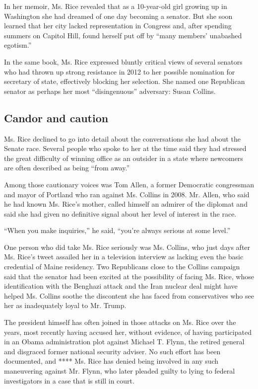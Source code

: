 In her memoir, Ms. Rice revealed that as a 10-year-old girl growing up
in Washington she had dreamed of one day becoming a senator. But she
soon learned that her city lacked representation in Congress and, after
spending summers on Capitol Hill, found herself put off by ``many
members' unabashed egotism.''

In the same book, Ms. Rice expressed bluntly critical views of several
senators who had thrown up strong resistance in 2012 to her possible
nomination for secretary of state, effectively blocking her selection.
She named one Republican senator as perhaps her most ``disingenuous''
adversary: Susan Collins.

\hypertarget{candor-and-caution}{%
\subsection{Candor and caution}\label{candor-and-caution}}

Ms. Rice declined to go into detail about the conversations she had
about the Senate race. Several people who spoke to her at the time said
they had stressed the great difficulty of winning office as an outsider
in a state where newcomers are often described as being ``from away.''

Among those cautionary voices was Tom Allen, a former Democratic
congressman and mayor of Portland who ran against Ms. Collins in 2008.
Mr. Allen, who said he had known Ms. Rice's mother, called himself an
admirer of the diplomat and said she had given no definitive signal
about her level of interest in the race.

``When you make inquiries,'' he said, ``you're always serious at some
level.''

One person who did take Ms. Rice seriously was Ms. Collins, who just
days after Ms. Rice's tweet assailed her in a television interview as
lacking even the basic credential of Maine residency. Two Republicans
close to the Collins campaign said that the senator had been excited at
the possibility of facing Ms. Rice, whose identification with the
Benghazi attack and the Iran nuclear deal might have helped Ms. Collins
soothe the discontent she has faced from conservatives who see her as
inadequately loyal to Mr. Trump.

The president himself has often joined in those attacks on Ms. Rice over
the years, most recently having accused her, without evidence, of having
participated in an Obama administration plot against Michael T. Flynn,
the retired general and disgraced former national security adviser. No
such effort has been documented, and **** Ms. Rice has denied being
involved in any such maneuvering against Mr. Flynn, who later pleaded
guilty to lying to federal investigators in a case that is still in
court.

